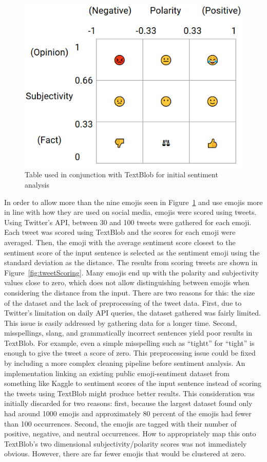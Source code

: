\documentclass{article}[10]
\begin{document}
\begin{figure}[h]
  \begin{center}
    \includegraphics[width=0.70\columnwidth]{figures/sentiment_table1.png}
    \caption{Table used in conjunction with TextBlob for initial sentiment
      analysis\label{fig:sentimentTable}}
  \end{center}
\end{figure}


In order to allow more than the nine emojis seen in
Figure~{\ref{fig:sentimentTable}} and use emojis more in line with how they are
used on social media, emojis were scored using tweets. Using Twitter's API,
between 30 and 100 tweets were gathered for each emoji. Each tweet was scored
using TextBlob and the scores for each emoji were averaged. Then, the emoji with
the average sentiment score closest to the sentiment score of the input sentence is selected as the
sentiment emoji using the standard deviation as the
distance. The results from scoring tweets are shown in
Figure~\ref{fig:tweetScoring}. Many emojis end up with the polarity and
subjectivity values close to zero, which does not allow distinguishing between
emojis when considering the distance from the input. There are two reasons for this:
the size of the dataset and the lack of preprocessing of the tweet data. First,
due to Twitter's limitation on daily API queries, the dataset gathered was
fairly limited. This issue is easily addressed by gathering data for a longer
time. Second, misspellings, slang, and grammatically incorrect sentences yield
poor results in TextBlob. For example, even a simple misspelling such as
``tightt'' for ``tight'' is enough to give the tweet a score of zero. This
preprocessing issue could be fixed by including a more complex cleaning pipeline
before sentiment analysis. An implementation linking an existing public
emoji-sentiment dataset from something like Kaggle to sentiment scores of the
input sentence instead of scoring the tweets using TextBlob might produce better
results. This consideration was initially discarded for two reasons: first,
because the largest dataset found only had around 1000 emojis and approximately
80 percent of the emojis had fewer than 100 occurrences. Second, the emojis are
tagged with their number of positive, negative, and neutral occurrences. How to
appropriately map this onto TextBlob's two dimensional subjectivity/polarity
scores was not immediately obvious. However, there are far fewer emojis that
would be clustered at zero.
\end{document}
